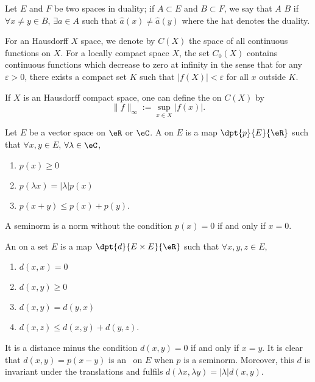 \begin{definition}\label{def:separe}
Let $E$ and $F$ be two spaces in duality; if $A\subset E$ and $B\subset F$, we say that $A$  $B$ if $\forall x\neq y\in B$, $\exists a\in A$ such that $\hat{a}(x)\neq\hat{a}(y)$ where the hat denotes the duality.
\end{definition}

For an Hausdorff $X$ space, we denote by $C(X)$\label{pg_def_Cz } the space of all continuous functions on $X$. For a locally compact space $X$, the set $C_0(X)$ contains continuous functions which decrease to zero at infinity in the sense that for any $\varepsilon>0$, there exists a compact set $K$ such that $|f(X)|<\varepsilon$ for all $x$ outside $K$.

\begin{definition}
If $X$ is an Hausdorff compact space, one can define the  on $C(X)$ by
\begin{equation}
   \|f\|_{\infty}:=\sup_{x\in X}|f(x)|.
\end{equation}
\label{def:sup_norm}
\end{definition}

\begin{definition}
Let $E$ be a vector space on $\eR$ or $\eC$. A  on $E$ is a map $\dpt{p}{E}{\eR}$ such that $\forall x,y\in E$, $\forall\lambda\in\eC$,
\begin{enumerate}
\item $p(x)\geq 0$
\item $p(\lambda x)=|\lambda|p(x)$
\item $p(x+y)\leq p(x)+p(y)$.
\end{enumerate}
\end{definition}
A seminorm is a norm without the condition  $p(x)=0$ if and only if $x=0$.

\begin{definition}
An  on a set $E$ is a map $\dpt{d}{E\times E}{\eR}$ such that $\forall x,y,z\in E$,
\begin{enumerate}
\item $d(x,x)=0$
\item $d(x,y)\geq 0$
\item $d(x,y)=d(y,x)$
\item $d(x,z)\leq d(x,y)+d(y,z)$.
\end{enumerate}
\end{definition}
It is a distance minus the condition  $d(x,y)=0$ if and only if $x=y$.
It is clear that $d(x,y)=p(x-y)$ is an \ecart\ on $E$ when $p$ is a seminorm. Moreover, this $d$ is invariant under the translations and fulfils $d(\lambda x,\lambda y)=|\lambda|d(x,y)$.

